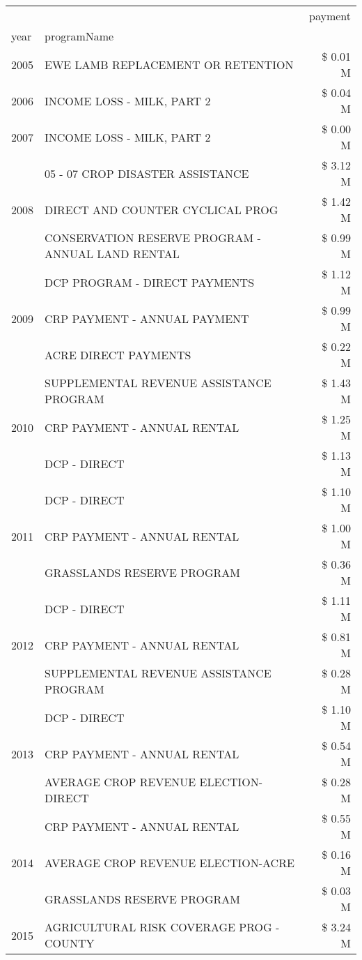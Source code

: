 \begin{tabular}{llr}
\toprule
 &  & payment \\
year & programName &  \\
\midrule
2005 & EWE LAMB REPLACEMENT OR RETENTION & \$ 0.01 M \\
\cline{1-3}
2006 & INCOME LOSS - MILK, PART 2 & \$ 0.04 M \\
\cline{1-3}
2007 & INCOME LOSS - MILK, PART 2 & \$ 0.00 M \\
\cline{1-3}
\multirow[t]{3}{*}{2008} & 05 - 07 CROP DISASTER ASSISTANCE & \$ 3.12 M \\
 & DIRECT AND COUNTER CYCLICAL PROG & \$ 1.42 M \\
 & CONSERVATION RESERVE PROGRAM - ANNUAL LAND RENTAL & \$ 0.99 M \\
\cline{1-3}
\multirow[t]{3}{*}{2009} & DCP PROGRAM - DIRECT PAYMENTS & \$ 1.12 M \\
 & CRP PAYMENT - ANNUAL PAYMENT & \$ 0.99 M \\
 & ACRE DIRECT PAYMENTS & \$ 0.22 M \\
\cline{1-3}
\multirow[t]{3}{*}{2010} & SUPPLEMENTAL REVENUE ASSISTANCE PROGRAM & \$ 1.43 M \\
 & CRP PAYMENT - ANNUAL RENTAL & \$ 1.25 M \\
 & DCP - DIRECT & \$ 1.13 M \\
\cline{1-3}
\multirow[t]{3}{*}{2011} & DCP - DIRECT & \$ 1.10 M \\
 & CRP PAYMENT - ANNUAL RENTAL & \$ 1.00 M \\
 & GRASSLANDS RESERVE PROGRAM & \$ 0.36 M \\
\cline{1-3}
\multirow[t]{3}{*}{2012} & DCP - DIRECT & \$ 1.11 M \\
 & CRP PAYMENT - ANNUAL RENTAL & \$ 0.81 M \\
 & SUPPLEMENTAL REVENUE ASSISTANCE PROGRAM & \$ 0.28 M \\
\cline{1-3}
\multirow[t]{3}{*}{2013} & DCP - DIRECT & \$ 1.10 M \\
 & CRP PAYMENT - ANNUAL RENTAL & \$ 0.54 M \\
 & AVERAGE CROP REVENUE ELECTION-DIRECT & \$ 0.28 M \\
\cline{1-3}
\multirow[t]{3}{*}{2014} & CRP PAYMENT - ANNUAL RENTAL & \$ 0.55 M \\
 & AVERAGE CROP REVENUE ELECTION-ACRE & \$ 0.16 M \\
 & GRASSLANDS RESERVE PROGRAM & \$ 0.03 M \\
\cline{1-3}
\multirow[t]{3}{*}{2015} & AGRICULTURAL RISK COVERAGE PROG - COUNTY & \$ 3.24 M \\

\end{tabular}
